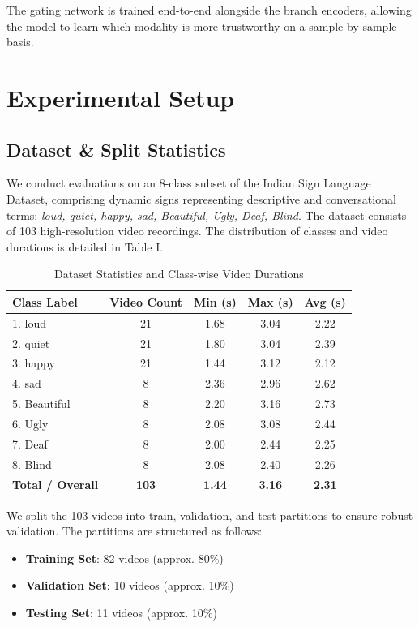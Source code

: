 \documentclass[conference]{IEEEtran}
\begin{document}
The gating network is trained end-to-end alongside the branch encoders, allowing the model to learn which modality is more trustworthy on a sample-by-sample basis.

\section{Experimental Setup}
\subsection{Dataset & Split Statistics}
We conduct evaluations on an 8-class subset of the Indian Sign Language Dataset, comprising dynamic signs representing descriptive and conversational terms: \textit{loud, quiet, happy, sad, Beautiful, Ugly, Deaf, Blind}. The dataset consists of 103 high-resolution video recordings. The distribution of classes and video durations is detailed in Table I.

\begin{table}[h]
\centering
\caption{Dataset Statistics and Class-wise Video Durations}
\begin{tabular}{lcccc}
\toprule
\textbf{Class Label} & \textbf{Video Count} & \textbf{Min (s)} & \textbf{Max (s)} & \textbf{Avg (s)} \\
\midrule
1. loud & 21 & 1.68 & 3.04 & 2.22 \\
2. quiet & 21 & 1.80 & 3.04 & 2.39 \\
3. happy & 21 & 1.44 & 3.12 & 2.12 \\
4. sad & 8 & 2.36 & 2.96 & 2.62 \\
5. Beautiful & 8 & 2.20 & 3.16 & 2.73 \\
6. Ugly & 8 & 2.08 & 3.08 & 2.44 \\
7. Deaf & 8 & 2.00 & 2.44 & 2.25 \\
8. Blind & 8 & 2.08 & 2.40 & 2.26 \\
\midrule
\textbf{Total / Overall} & \textbf{103} & \textbf{1.44} & \textbf{3.16} & \textbf{2.31} \\
\bottomrule
\end{tabular}
\label{tab:dataset}
\end{table}

We split the 103 videos into train, validation, and test partitions to ensure robust validation. The partitions are structured as follows:
\begin{itemize}
    \item \textbf{Training Set}: 82 videos (approx. 80\%)
    \item \textbf{Validation Set}: 10 videos (approx. 10\%)
    \item \textbf{Testing Set}: 11 videos (approx. 10\%)
\end{itemize}
\end{document}
